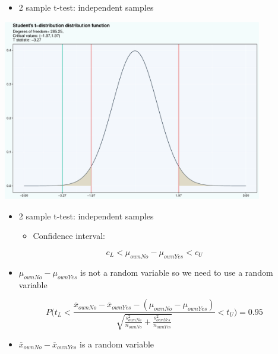 \documentclass[
  ignorenonframetext,
]{beamer}
\providecommand{\tightlist}{%
  \setlength{\itemsep}{0pt}\setlength{\parskip}{0pt}}\usepackage{longtable,booktabs,array}
\begin{document}
\begin{frame}{}
\label{section-17}
\begin{itemize}
\tightlist
\item
  2 sample t-test: independent samples
\end{itemize}

\begin{center}
\includegraphics[width=0.85\textwidth,height=\textheight]{006_comparing_groups_statistical_tests_files/figure-beamer/unnamed-chunk-17-1.pdf}
\end{center}
\end{frame}

\begin{frame}{}
\label{section-18}
\begin{itemize}
\item
  2 sample t-test: independent samples

  \begin{itemize}
  \tightlist
  \item
    Confidence interval:
  \end{itemize}
\end{itemize}

\[c_L < \mu_{ownNo} - \mu_{ownYes} < c_U\]

\begin{itemize}
\tightlist
\item
  \(\mu_{ownNo} - \mu_{ownYes}\) is not a random variable so we need to
  use a random variable
\end{itemize}

\[P \Biggr( t_L < \frac{\overline{x}_{ownNo} - \overline{x}_{ownYes} - (\mu_{ownNo} - \mu_{ownYes})}{\sqrt{\frac{s^2_{ownNo}}{n_{ownNo} } +\frac{s^2_{ownYes}}{n_{ownYes}}}} < t_U \Biggr) = 0.95\]

\begin{itemize}
\tightlist
\item
  \(\overline{x}_{ownNo} - \overline{x}_{ownYes}\) is a random variable
\end{itemize}
\end{frame}
\end{document}
